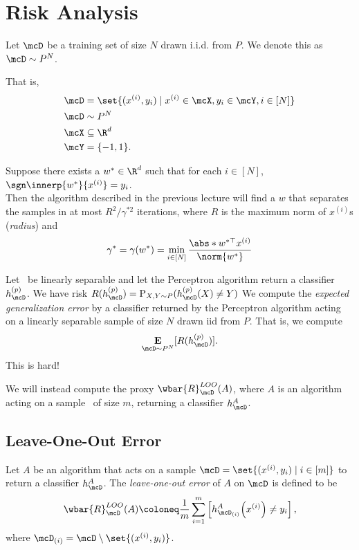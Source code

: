 \section{Risk Analysis} \label{sec:perceptron:risk}
Let $\mcD$ be a training set of size $N$ drawn i.i.d. from $P$.
We denote this as $\mcD \sim P^N$.

That is, \begin{align*}
    \mcD &= \set{(x^{(i)}, y_i) \mid x^{(i)} \in \mcX, y_i \in \mcY,
                                i \in [N]} \\
    \mcD &\sim P^{N} \\
    \mcX &\subseteq \R^d \\
    \mcY &= \pms.
\end{align*}

Suppose there exists a $w^* \in \R^d$ such that for each $i \in [N]$,
$\sgn \innerp{w^*}{x^{(i)}} = y_i$. \\
Then the algorithm described in the previous lecture will find a $w$ that
separates the samples in at most $R^2/\gamma^{*2}$ iterations,
where $R$ is the maximum norm of $x^{(i)}$s (\emph{radius}) and \[
    \gamma^* = \gamma(w^*)
        = \min_{i \in [N]} \frac{\abs*{w^{*\top} x^{(i)}}}{\norm{w^*}}
\]

Let \mcD\ be linearly separable and let the Perceptron algorithm return a
classifier $h_\mcD^{(p)}$.
We have risk $R(h_\mcD^{(p)}) = \Pr_{X, Y \sim P}(h_\mcD^{(p)}(X) \neq Y)$
We compute the \emph{expected generalization error} by a classifier returned
by the Perceptron algorithm acting on a linearly separable sample of size
$N$ drawn iid from $P$.
That is, we compute \[
    \E_{\mcD \sim P^{N}}[R(h_\mcD^{(p)})].
\] This is hard!

We will instead compute the proxy $\wbar{R}^{LOO}_\mcD(A)$, where $A$ is an
algorithm acting on a sample \mcD\ of size $m$, returning a classifier
$h_\mcD^{A}$.

\subsection{Leave-One-Out Error} \label{sec:loo}

\begin{definition*} \label{def:loo}
    Let $A$ be an algorithm that acts on a sample
    $\mcD = \set{(x^{(i)}, y_i) \mid i \in [m]}$ to return a
    classifier $h_\mcD^{A}$.
    The \emph{leave-one-out error} of $A$ on $\mcD$ is defined to be \[
        \wbar{R}^{LOO}_\mcD(A) \coloneq \frac1m \sum_{i=1}^{m}
            \left[h_{\mcD_{(i)}}^A\!\left(x^{(i)}\right) \ne y_i\right],
    \] where $\mcD_{(i)} = \mcD \setminus \set{(x^{(i)}, y_i)}$.
\end{definition*}


